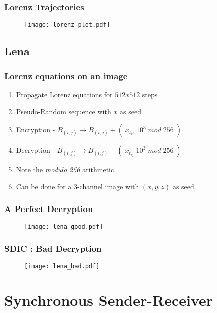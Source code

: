 \documentclass[xcolor=dvipsnames]{beamer}
\begin{document}
\begin{frame}
\frametitle{Lorenz Trajectories}
\begin{figure}
\centering
\texttt{[image: lorenz\_plot.pdf]}
\end{figure}
\end{frame}

\subsection*{Lena}
\begin{frame}
\frametitle{Lorenz equations on an image}
\begin{enumerate}
\item
Propagate Lorenz equations for $512x512$ steps
\newline
\item
Pseudo-Random sequence with $x$ as \alert{seed}
\newline
\item
\alert{Encryption} -  $B_{(i,j)} \rightarrow B_{(i,j)} + (\; x_{t_{ij}}\;10^3\;mod\;256\;)$
\newline
\item
\alert{Decryption} - $B_{(i,j)} \rightarrow B_{(i,j)} - (\; x_{t_{ij}}\;10^3 \;mod\;256\;)$
\newline
\item
Note the {\em modulo 256} arithmetic
\newline
\item
Can be done for a 3-channel image with $(x, y, z)$ as seed
\end{enumerate}
\end{frame}

\begin{frame}
\frametitle{A Perfect Decryption}
\begin{figure}
\centering
\texttt{[image: lena\_good.pdf]}
\end{figure}
\end{frame}

\begin{frame}
\frametitle{SDIC : Bad Decryption}
\begin{figure}
\centering
\texttt{[image: lena\_bad.pdf]}
\end{figure}
\end{frame}

\section[Sync s-r]{Synchronous Sender-Receiver}
\end{document}
